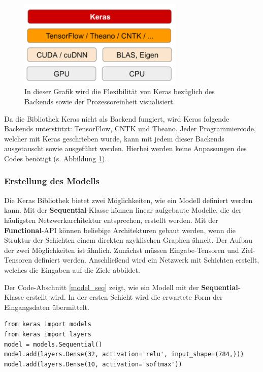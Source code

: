 \begin{figure}[h!]
	\centering
	\includegraphics[width=0.7\textwidth]{bilder/keras_backend.PNG}
	\caption{In dieser Grafik wird die Flexibilität von Keras bezüglich des Backends sowie der Prozessoreinheit visualisiert\cite{francois}.}
	\label{keras_backend}
\end{figure}

Da die Bibliothek Keras nicht als Backend fungiert, wird Keras folgende Backends unterstützt: TensorFlow, CNTK und Theano. Jeder Programmiercode, welcher mit Keras geschrieben wurde, kann mit jedem dieser Backends ausgetauscht sowie ausgeführt werden. Hierbei werden keine Anpassungen des Codes benötigt (s. Abbildung \ref{keras_backend})\cite{francois}.  

\subsubsection{Erstellung des Modells}

Die Keras Bibliothek bietet zwei Möglichkeiten, wie ein Modell definiert werden kann. Mit der \textbf{Sequential}-Klasse können linear aufgebaute Modelle, die der häufigsten Netzwerkarchitektur entsprechen, erstellt werden. Mit der \textbf{Functional}-API können beliebige Architekturen gebaut werden, wenn die Struktur der Schichten einem direkten azyklischen Graphen ähnelt. Der Aufbau der zwei Möglichkeiten ist ähnlich. Zunächst müssen Eingabe-Tensoren und Ziel-Tensoren definiert werden. Anschließend wird ein Netzwerk mit Schichten erstellt, welches die Eingaben auf die Ziele abbildet\cite{francois}.

Der Code-Abschnitt \ref{model_seq} zeigt, wie ein Modell mit der \textbf{Sequential}-Klasse erstellt wird. In der ersten Schicht wird die erwartete Form der Eingangsdaten übermittelt.

\begin{lstlisting}[caption={Erstellung eines Modells mit der \textbf{Sequential}-Klasse\cite{francois}.}, label=model_seq]
from keras import models
from keras import layers
model = models.Sequential()
model.add(layers.Dense(32, activation='relu', input_shape=(784,)))
model.add(layers.Dense(10, activation='softmax'))
\end{lstlisting}

